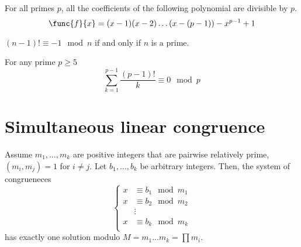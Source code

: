 \begin{corollary}
    For all primes \(p\), all the coefficients of the following polynomial are divisible by \(p\).
    \begin{equation*}
        \func{f}{x} = (x - 1) (x-2) \dots (x - (p-1)) - x^{p-1} + 1
    \end{equation*}
\end{corollary}

\begin{corollary}
    \((n-1)! \equiv -1 \mod n\) if and only if \(n\) is a prime.    
\end{corollary}

\begin{corollary}
    For any prime \(p \geq 5\)
    \begin{equation*}
        \sum_{k = 1}^{p-1} \dfrac{(p-1)!}{k} \equiv 0 \mod p
    \end{equation*}
\end{corollary}

\section{Simultaneous linear congruence}
\begin{theorem}
    Assume \(m_1,\dots, m_k\) are positive integers that are pairwise relatively prime, \((m_i,m_j) = 1\) for \(i \neq j\). Let \(b_1,\dots, b_k\) be arbitrary integers. Then, the system of congrueneces
    \begin{equation*}
        \begin{cases}
            x &\equiv b_1 \mod m_1\\
            x &\equiv b_2 \mod m_2\\
            &\vdots\\
            x &\equiv b_k \mod m_k\\
        \end{cases}
    \end{equation*}
    has exactly one solution modulo \(M = m_1\dots m_k = \prod m_i\).
\end{theorem}